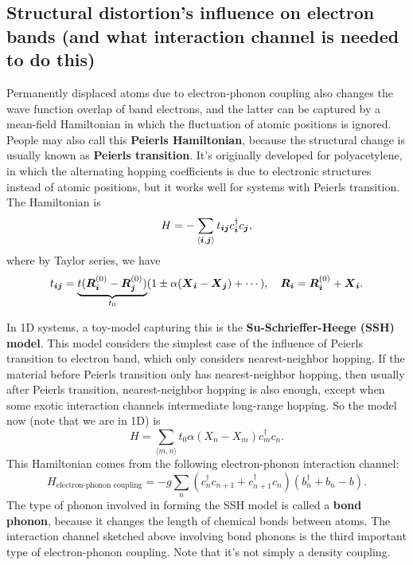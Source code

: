 \documentclass[hyperref, a4paper]{article}
\newcommand*{\pair}[1]{\langle #1 \rangle}
\newcommand*{\concept}[1]{{\textbf{#1}}}
\begin{document}
\subsection{Structural distortion's influence on electron bands (and what interaction channel is needed to do this)}

Permanently displaced atoms due to electron-phonon coupling 
also changes the wave function overlap of band electrons,
and the latter can be captured by a mean-field Hamiltonian 
in which the fluctuation of atomic positions is ignored.
People may also call this \concept{Peierls Hamiltonian},
because the structural change is usually known as 
\concept{Peierls transition}.
It's originally developed for polyacetylene,
in which the alternating hopping coefficients 
is due to electronic structures instead of atomic positions,
but it works well for systems with Peierls transition.
The Hamiltonian is 
\begin{equation}
    H = - \sum_{\pair{\vb*{i}, \vb*{j}}} 
    t_{\vb*{i} \vb*{j}} c^\dagger_{\vb*{i}} c_{\vb*{j}},
\end{equation}
where by Taylor series, we have
\begin{equation}
    t_{\vb*{i} \vb*{j}} = \underbrace{t(\vb*{R}_{\vb*{i}}^{(0)} - \vb*{R}^{(0)}_{\vb*{j}})}_{t_0} 
    (1 \pm \alpha (\vb*{X}_{\vb*{i}} - \vb*{X}_{\vb*{j}}) + \cdots),
    \quad \vb*{R}_{\vb*{i}} = \vb*{R}^{(0)}_{\vb*{i}} + \vb*{X}_{\vb*{i}}.
\end{equation}

In 1D systems, a toy-model capturing this is the 
\concept{Su-Schrieffer-Heege (SSH) model}.
This model considers the simplest case of the influence of Peierls transition to electron band,
which only considers nearest-neighbor hopping.
If the material before Peierls transition only has nearest-neighbor hopping, 
then usually after Peierls transition, 
nearest-neighbor hopping is also enough,
except when some exotic interaction channels 
intermediate long-range hopping.
So the model now (note that we are in 1D) is 
\begin{equation}
    H = \sum_{\pair{m, n}} t_0 \alpha (X_{n} - X_m) c^\dagger_m c_n.
\end{equation}
This Hamiltonian comes from the following electron-phonon interaction channel:
\begin{equation}
    H_{\text{electron-phonon coupling}}
    = - g \sum_{n} (c^\dagger_n c_{n+1} + c^\dagger_{n+1} c_n) (b^\dagger_{n} + b_n - b).
\end{equation}
The type of phonon involved in forming the SSH model 
is called a \concept{bond phonon},
because it changes the length of chemical bonds between atoms.
The interaction channel sketched above involving bond phonons 
is the third important type of electron-phonon coupling.
Note that it's not simply a density coupling.
\end{document}
